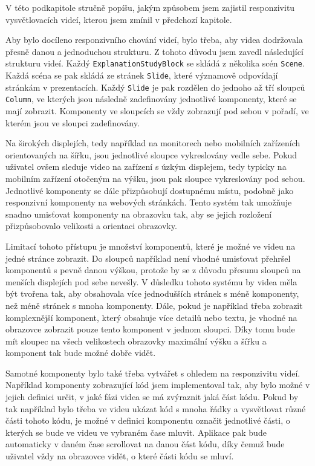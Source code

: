 V této podkapitole stručně popíšu, jakým způsobem jsem zajistil responzivitu vysvětlovacích videí, kterou jsem zmínil v předchozí kapitole.

Aby bylo docíleno responzivního chování videí, bylo třeba, aby videa dodržovala přesně danou a jednoduchou strukturu. Z tohoto důvodu jsem zavedl následující strukturu videí. Každý \texttt{ExplanationStudyBlock} se skládá z několika scén \texttt{Scene}. Každá scéna se pak skládá ze stránek \texttt{Slide}, které významově odpovídají stránkám v prezentacích. Každý \texttt{Slide} je pak rozdělen do jednoho až tří sloupců \texttt{Column}, ve kterých jsou následně zadefinovány jednotlivé komponenty, které se mají zobrazit. Komponenty ve sloupcích se vždy zobrazují pod sebou v pořadí, ve kterém jsou ve sloupci zadefinovány.

Na širokých displejích, tedy například na monitorech nebo mobilních zařízeních orientovaných na šířku, jsou jednotlivé sloupce vykreslovány vedle sebe. Pokud uživatel ovšem sleduje video na zařízení s úzkým displejem, tedy typicky na mobilním zařízení otočeným na výšku, jsou pak sloupce vykreslovány pod sebou. Jednotlivé komponenty se dále přizpůsobují dostupnému místu, podobně jako responzivní komponenty na webových stránkách. Tento systém tak umožňuje snadno umisťovat komponenty na obrazovku tak, aby se jejich rozložení přizpůsobovalo velikosti a orientaci obrazovky.

Limitací tohoto přístupu je množství komponentů, které je možné ve videu na jedné stránce zobrazit. Do sloupců například není vhodné umisťovat přehršel komponentů s pevně danou výškou, protože by se z důvodu přesunu sloupců na menších displejích pod sebe nevešly. V důsledku tohoto systému by videa měla být tvořena tak, aby obsahovala více jednodušších stránek s méně komponenty, než méně stránek s mnoha komponenty. Dále, pokud je například třeba zobrazit komplexnější komponent, který obsahuje více detailů nebo textu, je vhodné na obrazovce zobrazit pouze tento komponent v jednom sloupci. Díky tomu bude mít sloupec na všech velikostech obrazovky maximální výšku a šířku a komponent tak bude možné dobře vidět.


Samotné komponenty bylo také třeba vytvářet s ohledem na responzivitu videí. Například komponenty zobrazující kód jsem implementoval tak, aby bylo možné v jejich definici určit, v jaké fázi videa se má zvýraznit jaká část kódu. Pokud by tak například bylo třeba ve videu ukázat kód s mnoha řádky a vysvětlovat různé části tohoto kódu, je možné v definici komponentu označit jednotlivé části, o kterých se bude ve videu ve vybraném čase mluvit. Aplikace pak bude automaticky v daném čase scrollovat na danou část kódu, díky čemuž bude uživatel vždy na obrazovce vidět, o které části kódu se mluví.

